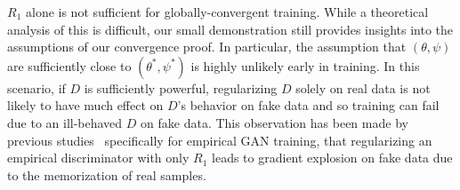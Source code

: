 

$R_1$ alone is not sufficient for globally-convergent training. While a theoretical analysis of this is difficult, our small demonstration still provides insights into the assumptions of our convergence proof. 
In particular, the assumption that $(\theta,\psi)$ are sufficiently close to $(\theta^*,\psi^*)$ is highly unlikely early in training. In this scenario, if $D$ is sufficiently powerful, regularizing $D$ solely on real data is not likely to have much effect on $D$'s behavior on fake data and so training can fail due to an ill-behaved $D$ on fake data. This observation has been made by previous studies~\cite{r1gradexp, r1gradexpcvpr} specifically for empirical GAN training, that regularizing an empirical discriminator with only $R_1$ leads to gradient explosion on fake data due to the memorization of real samples.


